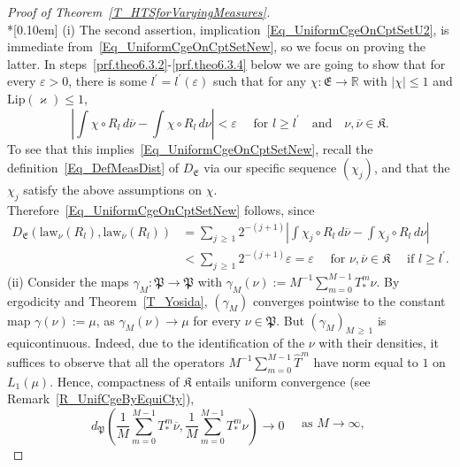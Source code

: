 \documentclass[AHL,Unicode,longabstracts]{cedram}
\newcommand{\law}{\mathrm{law}}
\newcommand{\Lip}{\mathrm{Lip}}
\newcommand{\frkK}{\mathfrak{K}}
\newcommand{\frkP}{\mathfrak{P}}
\newcommand{\frkE}{\mathfrak{E}}
\newcommand{\bbR}{\mathbb{R}}
\begin{document}
\begin{proof}[{Proof of Theorem~\ref{T_HTSforVaryingMeasures}}]\ \\*[0.10em]
\noindent(i) \label{prf.theo6.3.1} The second assertion, implication~\eqref{Eq_UniformCgeOnCptSetU2}, is immediate from~\eqref{Eq_UniformCgeOnCptSetNew}, so we focus on proving the latter. In steps~\eqref{prf.theo6.3.2}-\eqref{prf.theo6.3.4} below we are going to show that for every $\varepsilon>0$, there is some $l^{\prime}=l^{\prime}(\varepsilon)$ such that for any $\chi:\frkE\rightarrow\bbR$ with $\left\vert \chi\right\vert
\leq1$ and $\Lip(\varkappa)\leq1$,
\begin{equation}\label{Eq_Abschaetzig}
\left\vert \int\chi\circ R_{l}\,d\overline{\nu}-\int\chi\circ R_{l}
\,d\nu\right\vert <\varepsilon \quad\text{ for }l\geq l^{\prime}\quad\text{and}\quad\nu,\overline{\nu}\in\frkK.
\end{equation}
To see that this implies~\eqref{Eq_UniformCgeOnCptSetNew}, recall the definition~\eqref{Eq_DefMeasDist} of $D_{\frkE}$ via our specific sequence $(\chi_{j})$, and that the $\chi_{j}$ satisfy the above assumptions on $\chi$. Therefore~\eqref{Eq_UniformCgeOnCptSetNew} follows, since
\begin{align*}
D_{\frkE}\left(\law_{\nu}(R_{l}),\law_{\overline{\nu}} (R_{l})\right) & =\sum_{j\,\geq\,1}2^{-(j+1)}\left\vert \int\chi_{j}\circ R_{l}\,d\overline{\nu}-\int\chi_{j}\circ R_{l}\,d\nu\right\vert \\
& <\sum\limits_{j\,\geq\,1}2^{-(j+1)}\varepsilon=\varepsilon\quad\text{ for }\nu,\overline{\nu}\in\frkK\quad \text{ if }l\geq l^{\prime}.
\end{align*}
(ii)\label{prf.theo6.3.2} Consider the maps $\gamma_{M}:\frkP
\rightarrow\frkP$ with $\gamma_{M}(\nu):=M^{-1} {\sum_{m=0}^{M-1}} T_{\ast}^{m}\nu$. By ergodicity and Theorem~\ref{T_Yosida}, $(\gamma_{M})$ converges pointwise to the constant map $\gamma(\nu):=\mu$, as $\gamma_{M} (\nu)\rightarrow\mu$ for every $\nu\in\frkP$. But $(\gamma_{M})_{M\,\geq\,1}$ is equicontinuous. Indeed, due to the identification of the $\nu$ with their densities, it suffices to observe that all the operators $M^{-1} {\sum\nolimits_{m=0}^{M-1}}
\widehat{T}^{m}$ have norm equal to $1$ on $L_{1}(\mu)$. Hence, compactness of $\frkK$ entails uniform convergence (see Remark~\ref{R_UnifCgeByEquiCty}),
\[
d_{\frkP}\left(\frac{1}{M}\sum_{m=0}^{M-1}T_{\ast}^{m}\overline{\nu },\frac{1}{M}\sum_{m=0}^{M-1}T_{\ast}^{m}\nu\right) \longrightarrow0
\quad
\begin{aligned}
\text{as }M\rightarrow\infty\text{,}\\

\end{aligned}\]
\end{proof}
\end{document}
